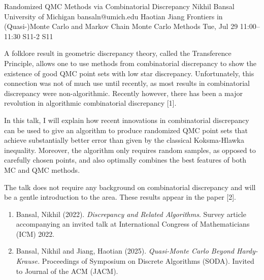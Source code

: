 \documentclass[12pt,lettersize,oneside]{book} %
\begin{document}
\begin{talk}
  {Randomized QMC Methods via Combinatorial Discrepancy}%
  {Nikhil Bansal}%
  {University of Michigan}%
  {bansaln@umich.edu}%
  {Haotian Jiang}%
  {Frontiers in (Quasi-)Monte Carlo and Markov Chain Monte Carlo Methods}%
  {Tue, Jul 29 11:00--11:30}%
  {S11-2}%
  {S11}%
    

A folklore result in geometric discrepancy theory, called the Transference Principle, allows one to use methods from combinatorial discrepancy to show the existence of good QMC point sets with low star discrepancy.
Unfortunately, this connection was not of much use until recently, as most results in combinatorial discrepancy were non-algorithmic. Recently however, there has been a major revolution in algorithmic combinatorial discrepancy [1]. 

In this talk, I will explain how recent innovations in combinatorial discrepancy can be used to give an algorithm to produce randomized QMC point sets that  achieve substantially better error than given by the classical Koksma-Hlawka inequality. Moreover, the algorithm only requires random samples, as opposed to carefully chosen points, and also optimally combines the best features of both MC and QMC methods.  

 

The talk does not require any background on combinatorial discrepancy and will be a gentle introduction to the area. 
These results appear in the paper [2].

\medskip

\begin{enumerate}
 \item[{[1]}] Bansal, Nikhil (2022). {\it Discrepancy and Related Algorithms}. Survey article accompanying an invited talk at 
     International Congress of Mathematicians (ICM) 2022.
     
 \item[{[2]}]  Bansal, Nikhil and Jiang, Haotian (2025). {\em Quasi-Monte Carlo Beyond Hardy-Krause.} Proceedings of Symposium on Discrete Algorithms (SODA). Invited to Journal of the ACM (JACM). 
\end{enumerate}
\end{talk}
\end{document}
